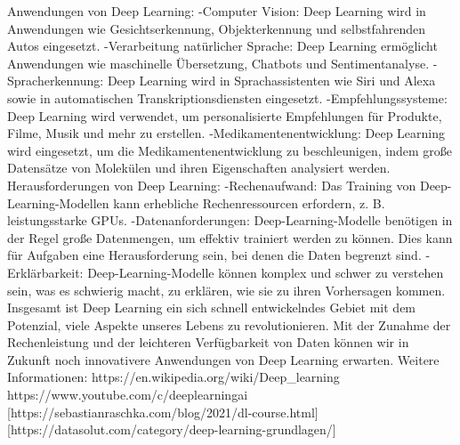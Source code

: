 Anwendungen von Deep Learning:
-Computer Vision: Deep Learning wird in Anwendungen wie Gesichtserkennung, Objekterkennung und selbstfahrenden Autos eingesetzt.
-Verarbeitung natürlicher Sprache: Deep Learning ermöglicht Anwendungen wie maschinelle Übersetzung, Chatbots und Sentimentanalyse.
-Spracherkennung: Deep Learning wird in Sprachassistenten wie Siri und Alexa sowie in automatischen Transkriptionsdiensten eingesetzt.
-Empfehlungssysteme: Deep Learning wird verwendet, um personalisierte Empfehlungen für Produkte, Filme, Musik und mehr zu erstellen.
-Medikamentenentwicklung: Deep Learning wird eingesetzt, um die Medikamentenentwicklung zu beschleunigen, indem große Datensätze von Molekülen und ihren Eigenschaften analysiert werden.
Herausforderungen von Deep Learning:
-Rechenaufwand: Das Training von Deep-Learning-Modellen kann erhebliche Rechenressourcen erfordern, z. B. leistungsstarke GPUs.
-Datenanforderungen: Deep-Learning-Modelle benötigen in der Regel große Datenmengen, um effektiv trainiert werden zu können. Dies kann für Aufgaben eine Herausforderung sein, bei denen die Daten begrenzt sind.
-Erklärbarkeit: Deep-Learning-Modelle können komplex und schwer zu verstehen sein, was es schwierig macht, zu erklären, wie sie zu ihren Vorhersagen kommen.
Insgesamt ist Deep Learning ein sich schnell entwickelndes Gebiet mit dem Potenzial, viele Aspekte unseres Lebens zu revolutionieren. Mit der Zunahme der Rechenleistung und der leichteren Verfügbarkeit von Daten können wir in Zukunft noch innovativere Anwendungen von Deep Learning erwarten.
Weitere Informationen:
https://en.wikipedia.org/wiki/Deep_learning
https://www.youtube.com/c/deeplearningai
[https://sebastianraschka.com/blog/2021/dl-course.html]
[https://datasolut.com/category/deep-learning-grundlagen/]





